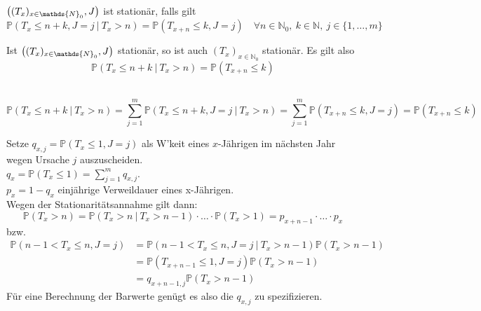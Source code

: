 $\enbrace{(T_x)_{x\in \mathds{N}_0},J}$ ist stationär, falls gilt 
\[ 
\mathds{P}(T_x\le n+k,J=j~|~T_x>n)=\mathds{P}(T_{x+n}\le k,J=j)\quad \forall n\in \mathds{N}_0,~k\in \mathds{N},~j\in \{1,\dots,m\} 
\]

Ist $\enbrace{(T_x)_{x\in \mathds{N}_0},J}$ stationär, so ist auch $(T_x)_{x\in \mathds{N}_0}$ stationär. 
Es gilt also 
\[ 
\mathds{P}(T_x\le n+k~|~T_x>n)=\mathds{P}(T_{x+n}\le k) 
\]

\\
\[ 
\mathds{P}(T_x\le n+k~|~T_x>n)= \sum_{j=1}^{m}\mathds{P}(T_x\le n+k,J=j~|~T_x>n)= \sum_{j=1}^{m}\mathds{P}(T_{x+n}\le k,J=j)= \mathds{P}(T_{x+n}\le k) 
\]

Setze $q_{x,j}=\mathds{P}(T_x\le 1,J=j)$ als W'keit eines $x$-Jährigen im nächsten Jahr wegen Ursache $j$ auszuscheiden.\\
$q_x=\mathds{P}(T_x\le 1)=\sum_{j=1}^{m}q_{x,j}$.\\
$p_x=1-q_x$ einjährige Verweildauer eines x-Jährigen.\\
Wegen der Stationaritätsannahme gilt dann: 
\[
\mathds{P}(T_x>n)=\mathds{P}(T_x>n~|~T_x>n-1)\cdot\dots \cdot \mathds{P}(T_x>1)= p_{x+n-1}\cdot \dots\cdot p_x
\]
bzw.
\begin{equation*}
\begin{aligned}
	\mathds{P}(n-1<T_x\le n,J=j) &= \mathds{P}(n-1<T_x\le n,J=j~|~T_x>n-1)\mathds{P}(T_x>n-1)\\
	&= \mathds{P}(T_{x+n-1}\le 1,J=j)\mathds{P}(T_x>n-1)\\
	&= q_{x+n-1,j}\mathds{P}(T_x>n-1)
\end{aligned}
\end{equation*}
Für eine Berechnung der Barwerte genügt es also die $q_{x,j}$ zu spezifizieren.\\

